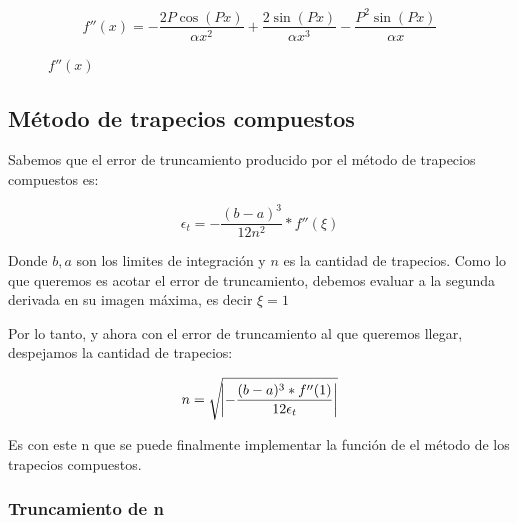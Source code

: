 \documentclass[11pt,a4paper]{article}
\begin{document}
\[ f''(x) = - \frac{2 P \cos{(P x)}}{\alpha x^2} + \frac{2 \sin{(P x)}}{\alpha x^3} - \frac{P^2 \sin{(P x)}}{\alpha x}\]

\begin{figure}[H]
	\caption{\(f''(x)\)}
	\label{fig:funcionderivada2}
\end{figure}

\subsection{Método de trapecios compuestos}

Sabemos que el error de truncamiento producido por el método de trapecios compuestos es:

\[ \epsilon_t = - \frac{{(b - a)}^3}{12 n^2} * f''(\xi) \]

Donde \(b, a\) son los limites de integración y \(n\) es la cantidad de trapecios. Como lo que queremos es acotar el error de truncamiento, debemos evaluar a la segunda derivada en su imagen máxima, es decir \(\xi = 1 \)

Por lo tanto, y ahora con el error de truncamiento al que queremos llegar, despejamos la cantidad de trapecios:

\[ n = \sqrt{ \abs{ - \frac{(b - a)^3 * f''(1)}{12 \epsilon_t}}} \]

Es con este n que se puede finalmente implementar la función de el método de los trapecios compuestos.

\subsubsection{Truncamiento de n}
\end{document}
